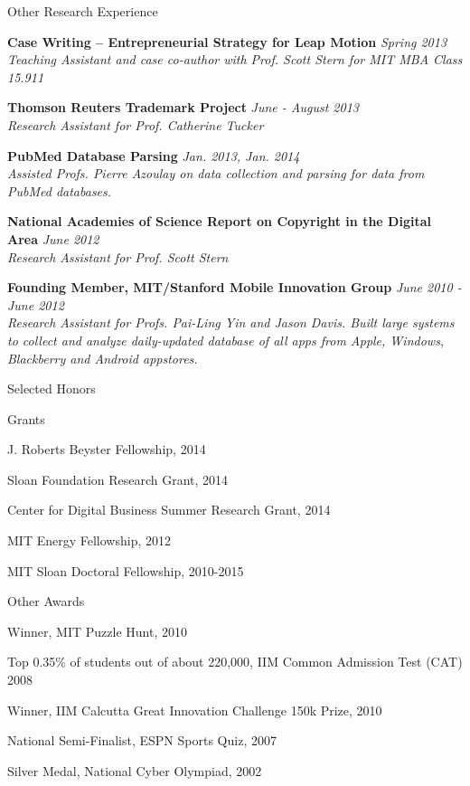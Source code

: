 \documentclass{resume} %
\begin{document}
\begin{rSection}{Other Research Experience}

{\bf Case Writing -- Entrepreneurial Strategy for Leap Motion} \emph{Spring 2013} \\
\emph{Teaching Assistant and case co-author with Prof. Scott Stern for MIT MBA Class 15.911}

{\bf Thomson Reuters Trademark Project} \emph{June - August 2013} \\
\emph{Research Assistant for Prof. Catherine Tucker}

{\bf PubMed Database Parsing} \emph{Jan. 2013, Jan. 2014} \\
\emph{Assisted Profs. Pierre Azoulay on data collection and parsing for data from PubMed databases. } 

{\bf National Academies of Science Report on Copyright in the Digital Area} \emph{June 2012} \\
\emph{Research Assistant for Prof. Scott Stern}

{\bf Founding Member, MIT/Stanford Mobile Innovation Group} \emph{June 2010 - June 2012} \\
\emph{Research Assistant for Profs. Pai-Ling Yin and Jason Davis. Built large systems to collect and analyze daily-updated database of all apps from Apple, Windows, Blackberry and Android appstores.} 

\end{rSection}


\begin{rSection}{Selected Honors}

\begin{rSubsection}{Grants}{}{}{}
\item J. Roberts Beyster Fellowship, 2014
\item Sloan Foundation Research Grant, 2014
\item Center for Digital Business Summer Research Grant, 2014
\item MIT Energy Fellowship, 2012
\item MIT Sloan Doctoral Fellowship, 2010-2015
\end{rSubsection}

\begin{rSubsection}{Other Awards}{}{}{}
\item Winner, MIT Puzzle Hunt, 2010
\item Top 0.35\% of students out of about 220,000, IIM Common Admission Test (CAT) 2008
\item Winner, IIM Calcutta Great Innovation Challenge 150k Prize, 2010
\item National Semi-Finalist, ESPN Sports Quiz, 2007
\item Silver Medal, National Cyber Olympiad, 2002
\end{rSubsection}

\end{rSection}
\end{document}
